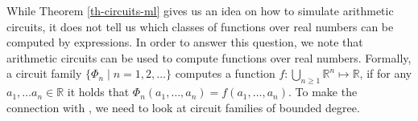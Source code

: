 %
%



\smallskip
While Theorem \ref{th-circuits-ml} gives us an idea on how to simulate arithmetic circuits, it does not tell us which classes of functions over real numbers can be computed by \langfor expressions. In order to answer this question, we note that arithmetic circuits can be used to compute functions over real numbers. Formally, a circuit family $\{\Phi_n\mid n=1,2,\ldots\}$ computes a function $f:\bigcup_{n\geq 1} \mathbb{R}^n\mapsto\mathbb{R}$, if for any $a_1,\ldots a_n\in \mathbb{R}$ it holds that $\Phi_n(a_1,\ldots ,a_n) = f(a_1,\ldots ,a_n)$. To make the connection with \langfor\!, we need to look at circuit families of bounded degree. 

